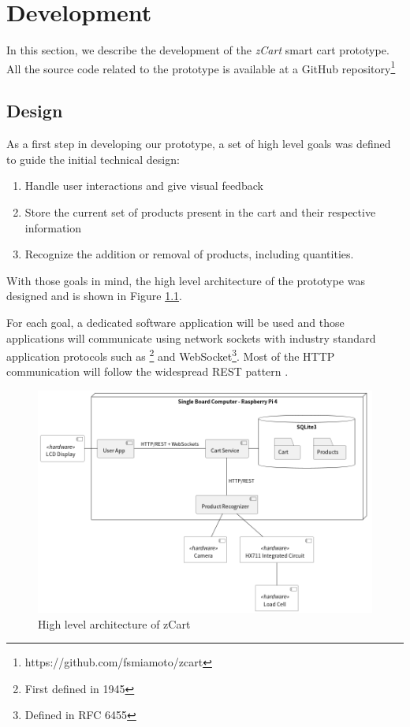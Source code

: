 \documentclass[openright]{normas-utf-tex} %
\begin{document}
\chapter{Development}
\label{chap:desenv}

In this section, we describe the development of the \textit{zCart} smart cart
prototype. All the source code related to the prototype is available at a
GitHub repository\footnote{https://github.com/fsmiamoto/zcart}

\section{Design}
\label{sec:design}

As a first step in developing our prototype, a set of
high level goals was defined to guide the initial technical design:

\begin{enumerate}
    \item Handle user interactions and give visual feedback
    \item Store the current set of products present in the cart and their respective information
    \item Recognize the addition or removal of products, including quantities.
\end{enumerate}

With those goals in mind, the high level architecture of the prototype
was designed and is shown in Figure \ref{fig:architecture}.

For each goal, a dedicated software application will be used and those
applications will communicate using 
network sockets \cite{Kurose2013} with industry standard application protocols such as
\footnote{First defined in
 1945} and WebSocket\footnote{Defined in RFC 6455}.
Most of the HTTP communication will follow the widespread REST pattern \cite{Roy2000}.

\begin{figure}[H]
	\centering
	\includegraphics[width=1\textwidth]{./images/zCart.png}
	\caption[High level architecture of zCart]{High level architecture of zCart}
	\label{fig:architecture}
\end{figure}
\end{document}

